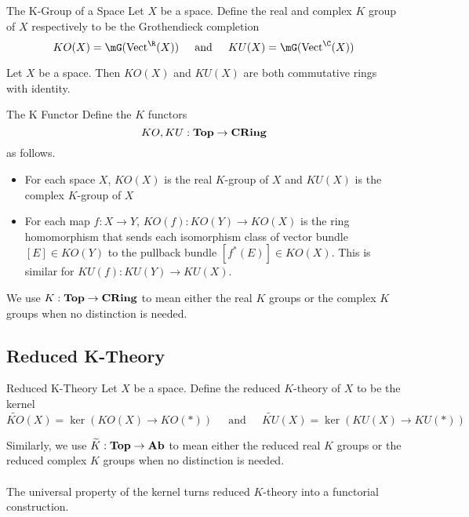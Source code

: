 \documentclass[a4paper]{article}
\begin{document}
\begin{defn}{The K-Group of a Space}{} Let $X$ be a space. Define the real and complex $K$ group of $X$ respectively to be the Grothendieck completion $$KO(X)=\mG(\text{Vect}^\R(X))\;\;\;\;\text{ and }\;\;\;\;KU(X)=\mG(\text{Vect}^\C(X))$$
\end{defn}

\begin{lmm}{}{} Let $X$ be a space. Then $KO(X)$ and $KU(X)$ are both commutative rings with identity. 
\end{lmm}

\begin{defn}{The K Functor}{} Define the $K$ functors $$KO,KU:\bold{Top}\to\bold{CRing}$$ as follows. 
\begin{itemize}
\item For each space $X$, $KO(X)$ is the real $K$-group of $X$ and $KU(X)$ is the complex $K$-group of $X$
\item For each map $f:X\to Y$, $KO(f):KO(Y)\to KO(X)$ is the ring homomorphism that sends each isomorphism class of vector bundle $[E]\in KO(Y)$ to the pullback bundle $[f^\ast(E)]\in KO(X)$. This is similar for $KU(f):KU(Y)\to KU(X)$. 
\end{itemize}
\end{defn}

We use $K:\bold{Top}\to\bold{CRing}$ to mean either the real $K$ groups or the complex $K$ groups when no distinction is needed. 

\subsection{Reduced K-Theory}
\begin{defn}{Reduced K-Theory}{} Let $X$ be a space. Define the reduced $K$-theory of $X$ to be the kernel $$\widetilde{KO}(X)=\ker(KO(X)\to KO(\ast))\;\;\;\;\text{ and }\;\;\;\;\widetilde{KU}(X)=\ker(KU(X)\to KU(\ast))$$
\end{defn}

Similarly, we use $\widetilde{K}:\bold{Top}\to\bold{Ab}$ to mean either the reduced real $K$ groups or the reduced complex $K$ groups when no distinction is needed. \\~\\

The universal property of the kernel turns reduced $K$-theory into a functorial construction. 
\end{document}

